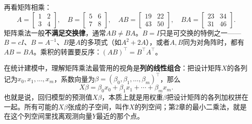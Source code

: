再看矩阵相乘：
\[
A=\begin{bmatrix}1&2\\3&4\end{bmatrix},\quad B=\begin{bmatrix}5&6\\7&8\end{bmatrix},
\quad AB=\begin{bmatrix}19&22\\43&50\end{bmatrix},\quad
BA=\begin{bmatrix}23&34\\31&46\end{bmatrix}.
\]
矩阵乘法一般\textbf{不满足交换律}，通常$AB\ne BA$。$B=I$只是可交换的特例之一——$B=cI$、$B=A^{-1}$、$B$是$A$的多项式（如$A^2+2A$），或者$A,B$同为对角阵时，都有$AB=BA$。乘积的转置要反序：$(AB)^\top=B^\top A^\top$。

在统计建模中，理解矩阵乘法最管用的视角是\textbf{列的线性组合}：把设计矩阵$X$的各列记为$x_0,x_1,\ldots,x_m$，系数向量为$\beta=(\beta_0,\beta_1,\ldots,\beta_m)^\top$，那么
\[
X\beta=\beta_0 x_0+\beta_1 x_1+\cdots+\beta_m x_m.
\]
也就是说，回归模型的预测值$X\beta$，本质上就是用权重$\beta$把设计矩阵的各列加权拼在一起。所有可能的$X\beta$张成的子空间，叫作$X$的列空间；第2章的最小二乘法，就是在这个列空间里找离观测向量$Y$最近的那个点。

